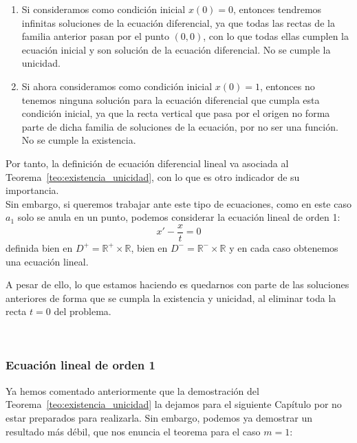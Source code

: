 \begin{ejemplo}
    \begin{enumerate}
        \item Si consideramos como condición inicial $x(0) = 0$, entonces tendremos infinitas soluciones de la ecuación diferencial, ya que todas las rectas de la familia anterior pasan por el punto $(0,0)$, con lo que todas ellas cumplen la ecuación inicial y son solución de la ecuación diferencial. No se cumple la unicidad.
        \item Si ahora consideramos como condición inicial $x(0)=1$, entonces no tenemos ninguna solución para la ecuación diferencial que cumpla esta condición inicial, ya que la recta vertical que pasa por el origen no forma parte de dicha familia de soluciones de la ecuación, por no ser una función. No se cumple la existencia.
    \end{enumerate}
    Por tanto, la definición de ecuación diferencial lineal va asociada al Teorema~\ref{teo:existencia_unicidad}, con lo que es otro indicador de su importancia.\\

    Sin embargo, si queremos trabajar ante este tipo de ecuaciones, como en este caso $a_1$ solo se anula en un punto, podemos considerar la ecuación lineal de orden 1:
    \begin{equation*}
        x' - \dfrac{x}{t} = 0
    \end{equation*}
    definida bien en $D^+ = \mathbb{R}^+\times \mathbb{R}$, bien en $D^- = \mathbb{R}^-\times \mathbb{R}$ y en cada caso obtenemos una ecuación lineal.

    A pesar de ello, lo que estamos haciendo es quedarnos con parte de las soluciones anteriores de forma que se cumpla la existencia y unicidad, al eliminar toda la recta $t=0$ del problema.
\end{ejemplo}~\\

\subsubsection{Ecuación lineal de orden 1}
Ya hemos comentado anteriormente que la demostración del Teorema~\ref{teo:existencia_unicidad} la dejamos para el siguiente Capítulo por no estar preparados para realizarla. Sin embargo, podemos ya demostrar un resultado más débil, que nos enuncia el teorema para el caso $m=1$:

